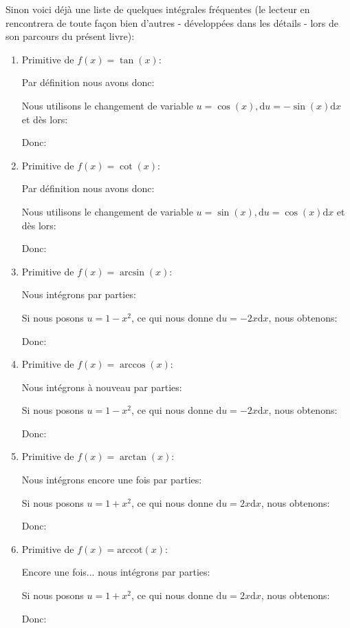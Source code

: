 	Sinon voici déjà une liste de quelques intégrales fréquentes (le lecteur en rencontrera de toute façon bien d'autres - développées dans les détails - lors de son parcours du présent livre): 
	\begin{enumerate}
		\item Primitive de $f(x)=\tan (x)$:
		
		Par définition nous avons donc:
		
		Nous utilisons le changement de variable $u=\cos(x),\mathrm{d}u=-\sin(x)\mathrm{d}x$ et dès lors:
		
		Donc:
		
		
		\item Primitive de $f(x)=\cot(x)$:
		
		Par définition nous avons donc:
		
		Nous utilisons le changement de variable $u=\sin(x),\mathrm{d}u=\cos(x)\mathrm{d}x$ et dès lors:
		 
		Donc:
		
		
		\item Primitive de $f(x)=\arcsin(x)$:
		
		Nous intégrons par parties:
		
		Si nous posons $u=1-x^2$, ce qui nous donne $\mathrm{d}u=-2x\mathrm{d}x$, nous obtenons:
		
		Donc:
		
		
		\item Primitive de $f(x)=\arccos(x)$:
		
		Nous intégrons à nouveau par parties:
		
		Si nous posons $u=1-x^2$, ce qui nous donne $\mathrm{d}u=-2x\mathrm{d}x$, nous obtenons:
		
		Donc:
		
		
		\item Primitive de $f(x)=\arctan(x)$:
		
		Nous intégrons encore une fois par parties:
		
		Si nous posons $u=1+x^2$, ce qui nous donne $\mathrm{d}u=2x\mathrm{d}x$, nous obtenons:
		
		Donc:
		
		
		\item Primitive de $f(x)=\text{arccot}(x)$:
		
		Encore une fois... nous intégrons par parties:
		
		Si nous posons  $u=1+x^2$, ce qui nous donne $\mathrm{d}u=2x\mathrm{d}x$, nous obtenons:
		
		Donc:
		

\end{enumerate}
